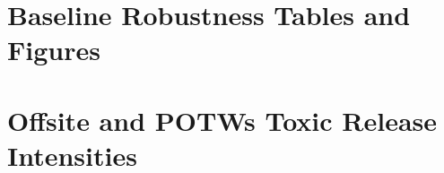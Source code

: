 \documentclass[12pt, english]{article}
\begin{document}
\begin{appendices}
        \section{Baseline Robustness Tables and Figures}\label{sec:appendix-baseline-robustness-tables-and-figures}
        
        
        
        
        
        
        
        


        \section{Offsite and POTWs Toxic Release Intensities}\label{sec:offsite-and-potws-toxic-release-intensities}
        
        
        
        
        

    \end{appendices}
    \newpage
    \printbibliography
\end{document}
